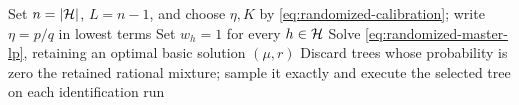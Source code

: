 \begin{algorithm}[H]
\caption{LP-compressed Las Vegas per-hypothesis identification}
\label{alg:randomized-mixture}
Set $n=|\mathcal H|$, $L=n-1$, and choose $\eta,K$ by
\eqref{eq:randomized-calibration}; write $\eta=p/q$ in lowest terms\;
Set $w_h=1$ for every $h\in\mathcal H$\;
Solve \eqref{eq:randomized-master-lp}, retaining an optimal basic
solution $(\mu,r)$\;
Discard trees whose probability is zero\;
\KwRet the retained rational mixture; sample it exactly and execute
the selected tree on each identification run\;
\end{algorithm}
